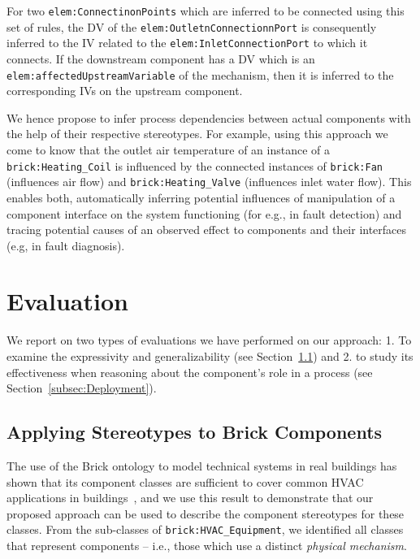 \documentclass[sigconf]{acmart}
\begin{document}
For two \texttt{elem:Con\-n\-ec\-tin\-on\-Poi\-nts} which are inferred to be connected using this set of rules, the DV of the \texttt{elem:Ou\-tl\-etn\-Con\-ne\-ct\-ion\-nP\-ort} is consequently inferred to  the IV related to the \texttt{elem:In\-let\-Con\-nec\-tion\-Port} to which it connects.
If the downstream component has a DV which is an \texttt{elem:aff\-ec\-ted\-Up\-st\-re\-am\-Var\-ia\-ble} of the mechanism, then it is inferred to  the corresponding IVs on the upstream component.

We hence propose to infer process dependencies between actual components with the help of their respective stereotypes.
For example, using this approach we come to know that the outlet air temperature of an instance of a \texttt{brick:Heating\_Coil} is influenced by the connected instances of \texttt{brick:Fan} (influences air flow) and \texttt{brick:Heating\_Valve} (influences inlet water flow).
This enables both, automatically inferring potential influences of manipulation of a component interface on the system functioning (for e.g., in fault detection) and tracing potential causes of an observed effect to components and their interfaces (e.g, in fault diagnosis).

\section{Evaluation}
\label{sec:evaluation}

We report on two types of evaluations we have performed on our approach: 1. To examine the expressivity and generalizability (see Section~\ref{subsec:Expressivity}) and 2. to study its effectiveness when reasoning about the component's role in a process (see Section~\ref{subsec:Deployment}).

\subsection{Applying Stereotypes to Brick Components}
\label{subsec:Expressivity}

The use of the Brick ontology to model technical systems in real buildings has shown that its component classes are sufficient to cover common HVAC applications in buildings~\cite{sd_balaji2016brick}, and we use this result to demonstrate that our proposed approach can be used to describe the component stereotypes for these classes.
From the sub-classes of \texttt{brick:HVAC\_E\-quip\-ment}, we identified all classes that represent components -- i.e., those which use a distinct \textit{physical mechanism}.
\end{document}
